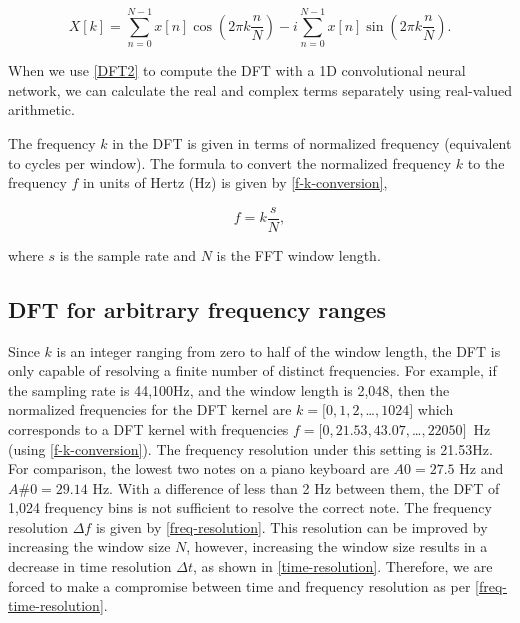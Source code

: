 \documentclass{ieeeaccess}
\begin{document}


\begin{equation} 
X[k] = \sum_{n=0}^{N-1}x[n] \cos(2\pi k \frac{n}{N}) - i \sum_{n=0}^{N-1}x[n]\sin(2\pi k \frac{n}{N})
\label{DFT2}.
\end{equation}


When we use \eqref{DFT2} to compute the DFT with a 1D convolutional neural network, we can calculate the real and complex terms separately using real-valued arithmetic.



The frequency $k$ in the DFT is given in terms of normalized frequency (equivalent to cycles per window). The formula to convert the normalized frequency $k$ to the frequency $f$ in units of Hertz (Hz) is given by \eqref{f-k-conversion},

\begin{equation}
 f= k\frac{s}{N} \label{f-k-conversion},
\end{equation}

where $s$ is the sample rate and $N$ is the FFT window length.



\subsection{DFT for arbitrary frequency ranges}
Since $k$ is an integer ranging from zero to half of the window length, the DFT is only capable of resolving a finite number of distinct frequencies. For example, if the sampling rate is 44,100Hz, and the window length is 2,048, then the normalized frequencies for the DFT kernel are $k=[0,1,2,$\ldots$,1024]$ which corresponds to a DFT kernel with frequencies  $f=[0,21.53,43.07,$\ldots$, 22050]$~Hz (using \eqref{f-k-conversion}).  The frequency resolution under this setting is 21.53Hz. For comparison, the lowest two notes on a piano keyboard are $A0=27.5$ Hz and $A\#0=29.14$ Hz. With a difference of less than 2 Hz between them, the DFT of 1,024 frequency bins is not sufficient to resolve the correct note. The frequency resolution $\Delta f$ is given by \eqref{freq-resolution}. This resolution can be improved by increasing the window size $N$, however, increasing the window size results in a decrease in time resolution $\Delta t$, as shown in \eqref{time-resolution}. Therefore, we are forced to make a compromise between time and frequency resolution as per \eqref{freq-time-resolution}.
\end{document}
